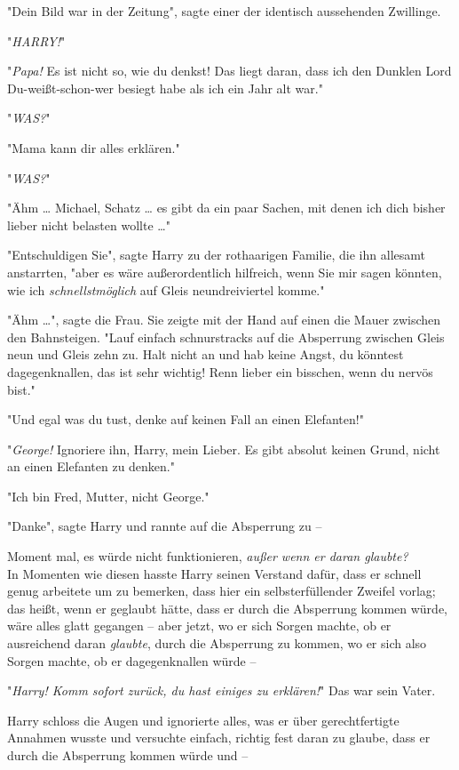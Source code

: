 {"Dein Bild war in der Zeitung", sagte einer der identisch aussehenden Zwillinge.

"\emph{HARRY!}"

"\emph{Papa!} Es ist nicht so, wie du denkst! Das liegt daran, dass ich den Dunklen Lord Du-weißt-schon-wer besiegt habe als ich ein Jahr alt war."

"\emph{WAS?}"

"Mama kann dir alles erklären."

"\emph{WAS?}"

"Ähm … Michael, Schatz … es gibt da ein paar Sachen, mit denen ich dich bisher lieber nicht belasten wollte …"

"Entschuldigen Sie", sagte Harry zu der rothaarigen Familie, die ihn allesamt anstarrten, "aber es wäre außerordentlich hilfreich, wenn Sie mir sagen könnten, wie ich \emph{schnellstmöglich} auf Gleis neundreiviertel komme."

"Ähm …", sagte die Frau. Sie zeigte mit der Hand auf einen die Mauer zwischen den Bahnsteigen. "Lauf einfach schnurstracks auf die Absperrung zwischen Gleis neun und Gleis zehn zu. Halt nicht an und hab keine Angst, du könntest dagegenknallen, das ist sehr wichtig! Renn lieber ein bisschen, wenn du nervös bist."

"Und egal was du tust, denke auf keinen Fall an einen Elefanten!"

"\emph{George!} Ignoriere ihn, Harry, mein Lieber. Es gibt absolut keinen Grund, nicht an einen Elefanten zu denken."

"Ich bin Fred, Mutter, nicht George."

"Danke", sagte Harry und rannte auf die Absperrung zu --

Moment mal, es würde nicht funktionieren, \emph{außer wenn er daran glaubte?}\\ In Momenten wie diesen hasste Harry seinen Verstand dafür, dass er schnell genug arbeitete um zu bemerken, dass hier ein selbsterfüllender Zweifel vorlag; das heißt, wenn er geglaubt hätte, dass er durch die Absperrung kommen würde, wäre alles glatt gegangen -- aber jetzt, wo er sich Sorgen machte, ob er ausreichend daran \emph{glaubte}, durch die Absperrung zu kommen, wo er sich also Sorgen machte, ob er dagegenknallen würde --

"\emph{Harry! Komm sofort zurück, du hast einiges zu erklären!}" Das war sein Vater.

Harry schloss die Augen und ignorierte alles, was er über gerechtfertigte Annahmen wusste und versuchte einfach, richtig fest daran zu glaube, dass er durch die Absperrung kommen würde und --

}
